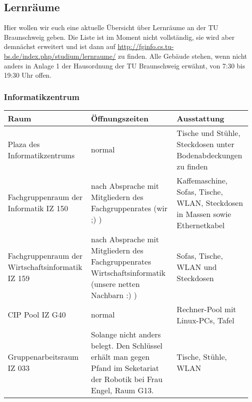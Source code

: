 \newpage
\subsection{Lernräume}
	Hier wollen wir euch eine aktuelle Übersicht über Lernräume an der TU Braunschweig geben. Die Liste ist im Moment nicht vollständig, sie wird aber demnächst erweitert und ist dann auf \url{http://fginfo.cs.tu-bs.de/index.php/studium/lernraume/} zu finden. Alle Gebäude stehen, wenn nicht anders in Anlage 1 der Hausordnung der TU Braunschweig erwähnt, von 7:30 bis 19:30 Uhr offen.
	\subsubsection*{Informatikzentrum}
		\begin{tabular}{|p{4cm}|p{5cm}|p{8cm}|}
			\hline Raum & Öffnungszeiten & Ausstattung \\ 
			\hline Plaza des Informatikzentrums & normal &  Tische und Stühle, Steckdosen unter Bodenabdeckungen zu finden \\
			\hline Fachgruppenraum der Informatik IZ 150 &
			nach Absprache mit Mitgliedern des
			Fachgruppenrates (wir ;) ) & Kaffemaschine,
			Sofas, Tische, WLAN, Steckdosen in Massen sowie Ethernetkabel\\ 
			\hline Fachgruppenraum der Wirtschaftsinformatik
			IZ 159 & nach Absprache mit Mitgliedern des
			Fachgruppenrates Wirtschaftsinformatik (unsere
			netten Nachbarn :) )& Sofas, Tische, WLAN und Steckdosen \\ 
			\hline CIP Pool IZ G40 & normal & Rechner-Pool mit Linux-PCs, Tafel\\ 
			\hline Gruppenarbeitsraum IZ 033 & 
			
			Solange nicht anders belegt. Den Schlüssel
			erhält man gegen Pfand im Seketariat der Robotik bei Frau Engel,
			Raum G13.
			 &
			Tische, Stühle, WLAN
			\\
			\hline
		\end{tabular}
